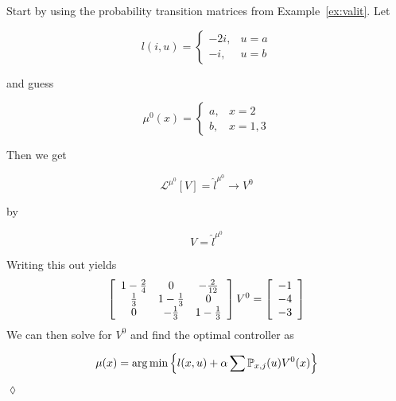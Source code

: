 \begin{example}
Start by using the probability transition matrices from Example~\ref{ex:valit}.
Let

\begin{equation*}
l(i,u) = \begin{cases} -2i, & u=a \\ -i, & u=b \end{cases}
\end{equation*}

and guess

\begin{equation*}
\mu^0(x) = \begin{cases} a, & x=2 \\ b, & x=1,3 \end{cases}
\end{equation*}

Then we get

\begin{equation*}
\mathcal{L}^{\mu^0}[V]=\hat{l}^{\mu^0} \to V^0
\end{equation*}

by

\begin{equation*}
[I-\alpha\mathbb{P}^{\mu^0}]V=\hat{l}^{\mu^0}
\end{equation*}

Writing this out yields
\begin{align}
\left[\begin{array}{c c c}
1-\frac{2}{4} & 0 & -\frac{2}{12} \\
\frac{1}{3} & 1-\frac{1}{3} & 0 \\
0 & -\frac{1}{3} & 1-\frac{1}{3}
\end{array}\right] V^0 =
\left[\begin{array}{c}
-1 \\ -4 \\ -3
\end{array}\right]
\end{align}
We can then solve for $V^0$ and find the optimal controller as

\begin{equation*}
\mu(x) = \arg\min\left\lbrace l(x,u)+\alpha\sum\mathbb{P}_{x,j}(u)V^0(x)\right\rbrace
\end{equation*}

$\lozenge$
\end{example}
